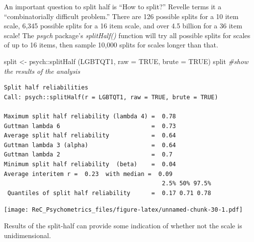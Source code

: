 \documentclass[
  english,
]{book}
\newenvironment{Shaded}{\begin{snugshade}}{\end{snugshade}}
\newcommand{\AttributeTok}[1]{\textcolor[rgb]{0.77,0.63,0.00}{#1}}
\newcommand{\CommentTok}[1]{\textcolor[rgb]{0.56,0.35,0.01}{\textit{#1}}}
\newcommand{\ConstantTok}[1]{\textcolor[rgb]{0.00,0.00,0.00}{#1}}
\newcommand{\DecValTok}[1]{\textcolor[rgb]{0.00,0.00,0.81}{#1}}
\newcommand{\FunctionTok}[1]{\textcolor[rgb]{0.00,0.00,0.00}{#1}}
\newcommand{\NormalTok}[1]{#1}
\newcommand{\OtherTok}[1]{\textcolor[rgb]{0.56,0.35,0.01}{#1}}
\newcommand{\SpecialCharTok}[1]{\textcolor[rgb]{0.00,0.00,0.00}{#1}}
\newcommand{\StringTok}[1]{\textcolor[rgb]{0.31,0.60,0.02}{#1}}
\begin{document}
An important question to split half is ``How to split?'' Revelle terms it a ``combinatorially difficult problem.'' There are 126 possible splits for a 10 item scale, 6,345 possible splits for a 16 item scale, and over 4.5 billion for a 36 item scale! The \emph{psych} package's \emph{splitHalf()} function will try all possible splits for scales of up to 16 items, then sample 10,000 splits for scales longer than that.

\begin{Shaded}
\begin{Highlighting}[]
\NormalTok{split }\OtherTok{\textless{}{-}}\NormalTok{ psych}\SpecialCharTok{::}\FunctionTok{splitHalf}\NormalTok{ (LGBTQT1, }\AttributeTok{raw =} \ConstantTok{TRUE}\NormalTok{, }\AttributeTok{brute =} \ConstantTok{TRUE}\NormalTok{)}
\NormalTok{split }\CommentTok{\#show the results of the analysis}
\end{Highlighting}
\end{Shaded}

\begin{verbatim}
Split half reliabilities  
Call: psych::splitHalf(r = LGBTQT1, raw = TRUE, brute = TRUE)

Maximum split half reliability (lambda 4) =  0.78
Guttman lambda 6                          =  0.73
Average split half reliability            =  0.64
Guttman lambda 3 (alpha)                  =  0.64
Guttman lambda 2                          =  0.7
Minimum split half reliability  (beta)    =  0.04
Average interitem r =  0.23  with median =  0.09
                                             2.5% 50% 97.5%
 Quantiles of split half reliability      =  0.17 0.71 0.78
\end{verbatim}

\begin{Shaded}
\end{Shaded}

\texttt{[image: ReC\_Psychometrics\_files/figure-latex/unnamed-chunk-30-1.pdf]}

Results of the split-half can provide some indication of whether not the scale is unidimensional.
\end{document}
